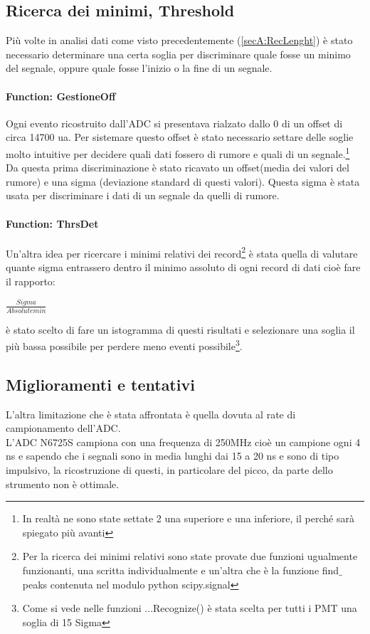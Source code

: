 \documentclass[a4paper]{article}
\begin{document}
\subsection{Ricerca dei minimi, Threshold}
\label{secA:Threshold}
Più volte in analisi dati come visto precedentemente (\ref{secA:RecLenght}) è stato necessario determinare una certa soglia per discriminare quale fosse un minimo del segnale, oppure quale fosse l'inizio o la fine di un segnale.
\paragraph{Function: GestioneOff}
Ogni evento ricostruito dall'ADC si presentava rialzato dallo 0 di un offset di circa 14700 ua. Per sistemare questo offset è stato necessario settare delle soglie molto intuitive per decidere quali dati fossero di rumore e quali di un segnale.\footnote{In realtà ne sono state settate 2 una superiore e una inferiore, il perché sarà spiegato più avanti} Da questa prima discriminazione è stato ricavato un offset(media dei valori del rumore) e una sigma (deviazione standard di questi valori). Questa sigma è stata usata per discriminare i dati di un segnale da quelli di rumore.
\paragraph{Function: ThrsDet}
Un'altra idea per ricercare i minimi relativi dei record\footnote{Per la ricerca dei minimi relativi sono state provate due funzioni ugualmente funzionanti, una scritta individualmente e un'altra che è la funzione find$\_$peaks contenuta nel modulo python scipy.signal} è stata quella di valutare quante sigma entrassero dentro il minimo assoluto di ogni record di dati cioè fare il rapporto:

\begin{center}
$\frac{Sigma}{Absolute min}$
\end{center}

è stato scelto di fare un istogramma di questi risultati e selezionare una soglia il più bassa possibile per perdere meno eventi possibile\footnote{Come si vede nelle funzioni ...Recognize() è stata scelta per tutti i PMT una soglia di 15 Sigma}.


\subsection{Miglioramenti e tentativi}
\label{sec:Tentativi}
L'altra limitazione che è stata affrontata è quella dovuta al rate di campionamento dell'ADC.\\
L'ADC N6725S campiona con una frequenza di 250MHz cioè un campione ogni 4 ns e sapendo che i segnali sono in media lunghi dai 15 a 20 ns e sono di tipo impulsivo, la ricostruzione di questi, in particolare del picco, da parte dello strumento non è ottimale.
\end{document}
